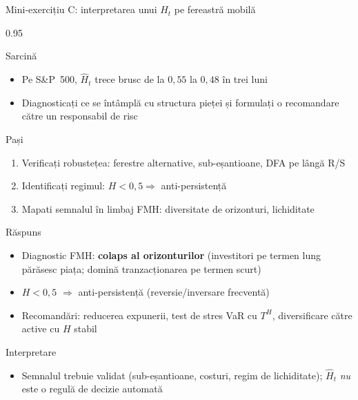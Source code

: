 \documentclass[9pt, aspectratio=169, t]{beamer}
\begin{document}
\begin{frame}[shrink=25]{Mini-exercițiu C: interpretarea unui $\hat H_t$ pe fereastră mobilă}
\begin{cminipage}{0.95\textwidth}
\begin{block}{Sarcină}
\begin{itemize}\setlength{\itemsep}{0pt}
    \item Pe S\&P~500, $\hat H_t$ trece brusc de la $0{,}55$ la $0{,}48$ în trei luni
    \item Diagnosticați ce se întâmplă cu structura pieței și formulați o recomandare către un responsabil de risc
\end{itemize}
\end{block}
\begin{block}{Pași}
\begin{enumerate}\setlength{\itemsep}{0pt}
    \item Verificați robustețea: ferestre alternative, sub-eșantioane, DFA pe lângă R/S
    \item Identificați regimul: $H<0{,}5\Rightarrow$ anti-persistență
    \item Mapati semnalul în limbaj FMH: diversitate de orizonturi, lichiditate
\end{enumerate}
\end{block}
\begin{exampleblock}{Răspuns}
\begin{itemize}\setlength{\itemsep}{0pt}
    \item Diagnostic FMH: \textbf{colaps al orizonturilor} (investitori pe termen lung părăsesc piața; domină tranzacționarea pe termen scurt)
    \item $H<0{,}5$ $\Rightarrow$ anti-persistență (reversie/inversare frecventă)
    \item Recomandări: reducerea expunerii, test de stres VaR cu $T^H$, diversificare către active cu $H$ stabil
\end{itemize}
\end{exampleblock}
\begin{alertblock}{Interpretare}
\begin{itemize}\setlength{\itemsep}{0pt}
    \item Semnalul trebuie validat (sub-eșantioane, costuri, regim de lichiditate); $\hat H_t$ \emph{nu} este o regulă de decizie automată
\end{itemize}
\end{alertblock}
\end{cminipage}
\end{frame}
\end{document}
